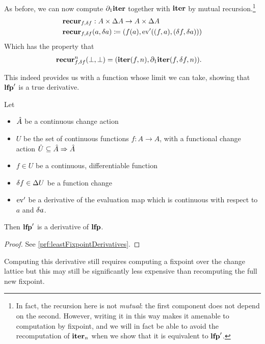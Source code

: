 As before, we can now compute $\partial_1{\mathbf{iter}}$ together with $\mathbf{iter}$ by
mutual recursion.\footnote{
  In fact, the recursion here is not \emph{mutual}: the first component does not
  depend on the second. However, writing it in this way makes it
  amenable to computation by fixpoint, and we will in fact be able to avoid the
  recomputation of $\mathbf{iter}_n$ when we show that it is equivalent to $\mathbf{lfp}'$.
}
\begin{align*}
  &\mathbf{recur}_{f, \delta f} : A \times \Delta A \rightarrow A \times \Delta A\\
  &\mathbf{recur}_{f, \delta f} (a, \delta a) \coloneqq (f(a), \operatorname{ev}'((f, a), (\delta f, \delta a)))
\end{align*}
Which has the property that
\begin{align*}
  &\mathbf{recur}_{f, \delta f}^n (\bot, \bot) = (\mathbf{iter}(f, n), \partial_1{\mathbf{iter}}(f, \delta f, n)).
\end{align*}

This indeed provides us with a function whose limit we can take, showing
that $\mathbf{lfp}'$ is a true derivative.

\begin{thm}[name=Derivatives of least fixpoint operators, restate=leastFixpointDerivatives]
  \label{thm:leastFixpointDerivatives}
  Let
  \begin{itemize}
    \item $\hat{A}$ be a continuous change action
    \item $U$ be the set of continuous functions $f : A \rightarrow A$, 
      with a functional change action $\hat{U} \subseteq \hat{A} \Rightarrow \hat{A}$
    \item $f \in U$ be a continuous, differentiable function
    \item $\delta f \in \Delta U$ be a function change
    \item $\operatorname{ev}'$ be a derivative of the evaluation map which is continuous with
      respect to $a$ and $\delta a$.
  \end{itemize}
  Then $\mathbf{lfp}'$ is a derivative of $\mathbf{lfp}$.
\end{thm}
\ifproofs
\begin{proof}
  See \cref{prf:leastFixpointDerivatives}.
\end{proof}
\fi

Computing this derivative still requires computing a fixpoint \textemdash{} over the change
lattice \textemdash{} but this may still be significantly less expensive than
recomputing the full new fixpoint.

